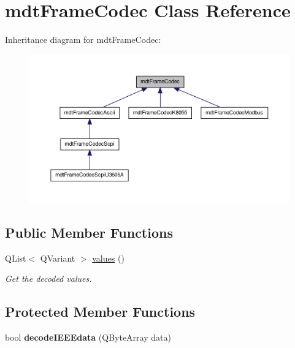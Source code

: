 \hypertarget{classmdt_frame_codec}{
\section{mdtFrameCodec Class Reference}
\label{classmdt_frame_codec}
}


Inheritance diagram for mdtFrameCodec:
\nopagebreak
\begin{figure}[H]
\begin{center}
\leavevmode
\includegraphics[width=400pt]{classmdt_frame_codec__inherit__graph}
\end{center}
\end{figure}
\subsection*{Public Member Functions}
\begin{DoxyCompactItemize}
\item 
\hypertarget{classmdt_frame_codec_a599a46e2d7cb5f80bd80e303236ead73}{
QList$<$ QVariant $>$ \hyperlink{classmdt_frame_codec_a599a46e2d7cb5f80bd80e303236ead73}{values} ()}
\label{classmdt_frame_codec_a599a46e2d7cb5f80bd80e303236ead73}

\begin{DoxyCompactList}\small\item\em Get the decoded values. \end{DoxyCompactList}\end{DoxyCompactItemize}
\subsection*{Protected Member Functions}
\begin{DoxyCompactItemize}
\item 
\hypertarget{classmdt_frame_codec_a6a47e1739b13c72883a01f5dd4bcffb6}{
bool {\bfseries decodeIEEEdata} (QByteArray data)}
\label{classmdt_frame_codec_a6a47e1739b13c72883a01f5dd4bcffb6}

\end{DoxyCompactItemize}
